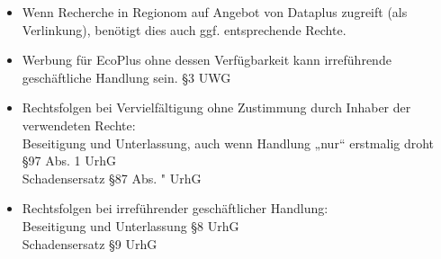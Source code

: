 \documentclass{scrreprt}
\begin{document}
\begin{anumerate}
\begin{itemize}
\item Wenn Recherche in Regionom auf Angebot von Dataplus zugreift (als Verlinkung), benötigt dies auch ggf. entsprechende Rechte.
\item Werbung für EcoPlus ohne dessen Verfügbarkeit kann irreführende geschäftliche Handlung sein. \hfill §3 UWG
\item Rechtsfolgen bei Vervielfältigung ohne Zustimmung durch Inhaber der verwendeten Rechte:\\
Beseitigung und Unterlassung, auch wenn Handlung „nur“ erstmalig droht \hfill §97 Abs. 1 UrhG\\
Schadensersatz \hfill §87 Abs. " UrhG
\item Rechtsfolgen bei irreführender geschäftlicher Handlung:\\
Beseitigung und Unterlassung \hfill §8 UrhG\\
Schadensersatz \hfill §9 UrhG
\end{itemize}
\end{anumerate}
\end{document}
